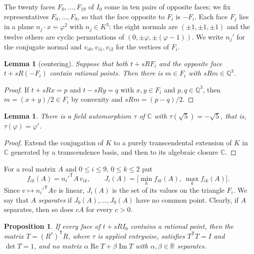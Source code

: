 \documentclass[11pt]{article}
\newtheorem{lemma}[theorem]{Lemma}
\newtheorem{proposition}[theorem]{Proposition}
\theoremstyle{definition}
\theoremstyle{remark}
\newcommand{\R}{\mathbb{R}}
\newcommand{\Q}{\mathbb{Q}}
\newcommand{\C}{\mathbb{C}}
\newcommand{\re}{\operatorname{Re}}
\newcommand{\im}{\operatorname{Im}}
\newcommand{\T}{\mathsf T}
\begin{document}
The twenty faces $F_0,\dots,F_{19}$ of $I_0$ come in ten pairs of opposite faces; we fix
representatives $F_0,\dots,F_9$, so that the face opposite to $F_i$ is $-F_i$. Each face $F_j$ lies in a
plane $n_j\cdot x=\varphi^2$ with $n_j\in K^3$: the eight normals are $(\pm1,\pm1,\pm1)$ and the
twelve others are cyclic permutations of $(0,\pm\varphi,\pm(\varphi-1))$. We write $n_j'$ for the
conjugate normal and $v_{i0},v_{i1},v_{i2}$ for the vertices of $F_i$.

\begin{lemma}[centering]\label{lem:center}
Suppose that both $t+sRF_i$ and the opposite face $t+sR(-F_i)$ contain rational points. Then there is
$m\in F_i$ with $sRm\in\Q^3$.
\end{lemma}

\begin{proof}
If $t+sRx=p$ and $t-sRy=q$ with $x,y\in F_i$ and $p,q\in\Q^3$, then $m=(x+y)/2\in F_i$ by convexity
and $sRm=(p-q)/2$.
\end{proof}

\begin{lemma}\label{lem:aut}
There is a field automorphism $\tau$ of $\C$ with $\tau(\sqrt5)=-\sqrt5$, that is,
$\tau(\varphi)=\varphi'$.
\end{lemma}

\begin{proof}
Extend the conjugation of $K$ to a purely transcendental extension of $K$ in $\C$ generated by a
transcendence basis, and then to its algebraic closure $\C$.
\end{proof}

For a real matrix $A$ and $0\le i\le9$, $0\le k\le2$ put
\[
  f_{ik}(A)=n_i'^{\T}A\,v_{ik},\qquad J_i(A)=\bigl[\min_k f_{ik}(A),\ \max_k f_{ik}(A)\bigr].
\]
Since $v\mapsto n_i'^{\T}Av$ is linear, $J_i(A)$ is the set of its values on the triangle $F_i$. We say
that $A$ \emph{separates} if $J_0(A),\dots,J_9(A)$ have no common point. Clearly, if $A$
separates, then so does $cA$ for every $c>0$.

\begin{proposition}\label{prop:red}
If every face of $t+sRI_0$ contains a rational point, then the matrix $T=(R^\tau)^{\T}R$, where
$\tau$ is applied entrywise, satisfies $T^{\T}T=I$ and $\det T=1$, and no matrix
$\alpha\re T+\beta\im T$ with $\alpha,\beta\in\R$ separates.
\end{proposition}
\end{document}
